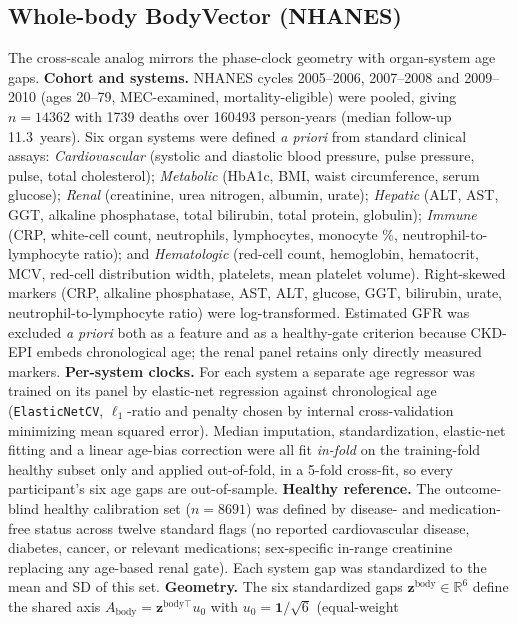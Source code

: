 \documentclass[11pt]{article}
\newcommand{\A}{\ensuremath{A}}
\begin{document}
\subsection{Whole-body BodyVector (NHANES)}
\label{sec:bodyvector}
The cross-scale analog mirrors the phase-clock geometry with organ-system age gaps.
\textbf{Cohort and systems.} NHANES cycles 2005--2006, 2007--2008 and
2009--2010 (ages 20--79, MEC-examined, mortality-eligible) were pooled, giving
$n=\num{14362}$ with
\num{1739} deaths over \num{160493} person-years (median follow-up \num{11.3}~years). Six
organ systems were defined \emph{a priori} from standard clinical assays:
\emph{Cardiovascular} (systolic and diastolic blood pressure, pulse pressure, pulse,
total cholesterol); \emph{Metabolic} (HbA1c, BMI, waist circumference, serum glucose);
\emph{Renal} (creatinine, urea nitrogen, albumin, urate); \emph{Hepatic} (ALT, AST, GGT,
alkaline phosphatase, total bilirubin, total protein, globulin); \emph{Immune} (CRP,
white-cell count, neutrophils, lymphocytes, monocyte \%, neutrophil-to-lymphocyte ratio);
and \emph{Hematologic} (red-cell count, hemoglobin, hematocrit, MCV, red-cell
distribution width, platelets, mean platelet volume). Right-skewed markers (CRP,
alkaline phosphatase, AST, ALT, glucose, GGT, bilirubin, urate, neutrophil-to-lymphocyte
ratio) were log-transformed. Estimated GFR was excluded \emph{a priori} both as a feature
and as a healthy-gate criterion because CKD-EPI embeds chronological age; the renal panel
retains only directly measured markers.
\textbf{Per-system clocks.} For each system a separate age regressor was trained on its
panel by elastic-net regression against chronological age (\texttt{ElasticNetCV},
$\ell_1$-ratio and penalty chosen by internal cross-validation minimizing mean squared
error). Median imputation, standardization, elastic-net fitting and a linear
age-bias correction were all fit \emph{in-fold} on the training-fold healthy subset only
and applied out-of-fold, in a 5-fold cross-fit, so every participant's six age gaps are
out-of-sample. \textbf{Healthy reference.} The outcome-blind healthy calibration set
($n=\num{8691}$) was defined by disease- and medication-free status across twelve
standard flags (no reported cardiovascular disease, diabetes, cancer, or relevant
medications; sex-specific in-range creatinine replacing any age-based renal gate). Each
system gap was standardized to the mean and SD of this set. \textbf{Geometry.} The six
standardized gaps $\mathbf{z}^{\text{body}}\in\mathbb{R}^6$ define the shared axis
$\A_{\text{body}}=\mathbf{z}^{\text{body}\top}u_0$ with $u_0=\mathbf{1}/\sqrt6$ (equal-weight
\end{document}
